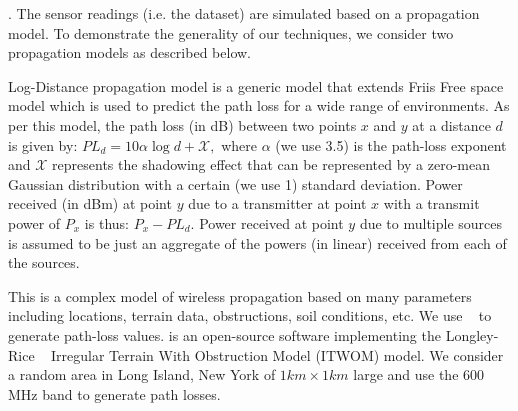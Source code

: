 
.
The sensor readings (i.e. the dataset) are simulated based on a propagation model. 
To demonstrate the generality of our techniques, we consider two propagation models as described below. 

Log-Distance propagation model is a generic model that extends Friis Free space model 
which is used to predict the path loss for a wide range of environments. 
As per this model, the path loss (in dB) between 
two points $x$ and $y$ at a distance $d$ is given by: $PL_d = 10\alpha\log{d} + \mathcal{X},$
where $\alpha$ (we use 3.5) is the path-loss exponent and $\mathcal{X}$ represents the shadowing effect that can be represented by a zero-mean Gaussian distribution with a certain (we use 1) standard deviation. 
Power received (in dBm) at point $y$ due to a transmitter at point $x$ with a 
transmit power of $P_x$ is thus: $P_{x} - PL_d$.
Power received at point $y$ due to multiple sources is assumed to be just an 
aggregate  of the powers (in linear) received from each of the sources.


This is a complex model of wireless propagation based on many parameters including locations, terrain data, obstructions, soil conditions, etc.
We use \splat~\cite{splat} to generate path-loss values. \splat is an open-source software implementing the Longley-Rice ~\cite{chamberlin82} Irregular Terrain With Obstruction Model (ITWOM) model.
We consider a random area in Long Island, New York of $1km \times 1km$ large and use the 600 MHz band to generate path losses.



